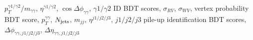 $p_T^{\gamma 1/\gamma 2}/m_{\gamma\gamma}$, $\eta^{\gamma 1/\gamma 2}$, $\cos{\Delta\phi_{\gamma\gamma}}$, $\gamma 1/\gamma 2$ ID BDT scores, $\sigma_{RV}$, $\sigma_{WV}$, vertex probability BDT score, $p_T^{\gamma\gamma}$, $N_{\rm{jets}}$, $m_{jj}$, $\eta^{j1/j2/j3}$, $j1/j2/j3$ pile-up identification BDT scores, $\Delta\phi_{\gamma\gamma,j1/j2/j3}$, $\Delta\eta_{\gamma\gamma,j1/j2/j3}$